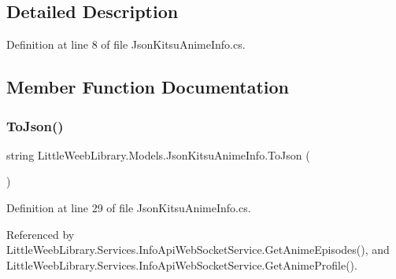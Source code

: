 \subsection{Detailed Description}


Definition at line 8 of file Json\+Kitsu\+Anime\+Info.\+cs.



\subsection{Member Function Documentation}
\mbox{\label{class_little_weeb_library_1_1_models_1_1_json_kitsu_anime_info_a6f026c01a93f73b903cfef82d4c2dad5}} 
\subsubsection{\texorpdfstring{To\+Json()}{ToJson()}}
{\footnotesize\ttfamily string Little\+Weeb\+Library.\+Models.\+Json\+Kitsu\+Anime\+Info.\+To\+Json (\begin{DoxyParamCaption}{ }\end{DoxyParamCaption})}



Definition at line 29 of file Json\+Kitsu\+Anime\+Info.\+cs.



Referenced by Little\+Weeb\+Library.\+Services.\+Info\+Api\+Web\+Socket\+Service.\+Get\+Anime\+Episodes(), and Little\+Weeb\+Library.\+Services.\+Info\+Api\+Web\+Socket\+Service.\+Get\+Anime\+Profile().


